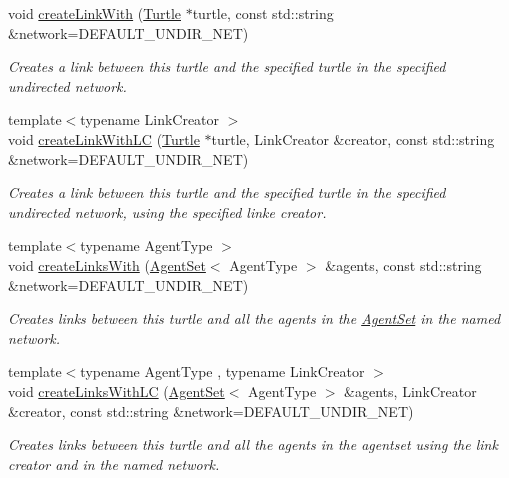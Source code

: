 \begin{DoxyCompactItemize}
void \hyperlink{classrepast_1_1relogo_1_1_turtle_a9eb0244977fa479a1ddab9edf9cc7d96}{create\-Link\-With} (\hyperlink{classrepast_1_1relogo_1_1_turtle}{Turtle} $\ast$turtle, const std\-::string \&network=D\-E\-F\-A\-U\-L\-T\-\_\-\-U\-N\-D\-I\-R\-\_\-\-N\-E\-T)
\begin{DoxyCompactList}\small\item\em Creates a link between this turtle and the specified turtle in the specified undirected network. \end{DoxyCompactList}\item 
{\footnotesize template$<$typename Link\-Creator $>$ }\\void \hyperlink{classrepast_1_1relogo_1_1_turtle_ab55c56347809251aa45ec3a3c4d34e62}{create\-Link\-With\-L\-C} (\hyperlink{classrepast_1_1relogo_1_1_turtle}{Turtle} $\ast$turtle, Link\-Creator \&creator, const std\-::string \&network=D\-E\-F\-A\-U\-L\-T\-\_\-\-U\-N\-D\-I\-R\-\_\-\-N\-E\-T)
\begin{DoxyCompactList}\small\item\em Creates a link between this turtle and the specified turtle in the specified undirected network, using the specified linke creator. \end{DoxyCompactList}\item 
{\footnotesize template$<$typename Agent\-Type $>$ }\\void \hyperlink{classrepast_1_1relogo_1_1_turtle_ab96df4a267218d86195330a826402053}{create\-Links\-With} (\hyperlink{classrepast_1_1relogo_1_1_agent_set}{Agent\-Set}$<$ Agent\-Type $>$ \&agents, const std\-::string \&network=D\-E\-F\-A\-U\-L\-T\-\_\-\-U\-N\-D\-I\-R\-\_\-\-N\-E\-T)
\begin{DoxyCompactList}\small\item\em Creates links between this turtle and all the agents in the \hyperlink{classrepast_1_1relogo_1_1_agent_set}{Agent\-Set} in the named network. \end{DoxyCompactList}\item 
{\footnotesize template$<$typename Agent\-Type , typename Link\-Creator $>$ }\\void \hyperlink{classrepast_1_1relogo_1_1_turtle_a322d98e98979872597a8d6fac5e07284}{create\-Links\-With\-L\-C} (\hyperlink{classrepast_1_1relogo_1_1_agent_set}{Agent\-Set}$<$ Agent\-Type $>$ \&agents, Link\-Creator \&creator, const std\-::string \&network=D\-E\-F\-A\-U\-L\-T\-\_\-\-U\-N\-D\-I\-R\-\_\-\-N\-E\-T)
\begin{DoxyCompactList}\small\item\em Creates links between this turtle and all the agents in the agentset using the link creator and in the named network. \end{DoxyCompactList}\item 

\end{DoxyCompactItemize}
